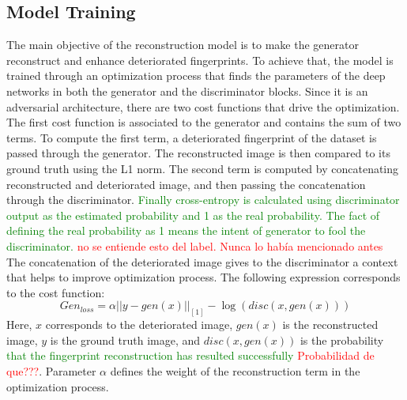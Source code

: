 \documentclass[a4paper,fleqn]{cas-dc}
\begin{document}
\subsection{Model Training}
\label{sec:MT}
The main objective of the reconstruction model is to make the generator reconstruct and enhance deteriorated fingerprints. To achieve that, the model is trained through an optimization process that finds the parameters of the deep networks in both the generator and the discriminator blocks. Since it is an adversarial architecture, there are two cost functions that drive the optimization. The first cost function is associated to the generator and contains the sum of two terms. To compute the first term, a deteriorated fingerprint of the dataset is passed through the generator. The reconstructed image is then compared to its ground truth using the L1 norm. The second term is computed by concatenating reconstructed and deteriorated image, and then passing the concatenation through the discriminator. \textcolor{green}{Finally cross-entropy is calculated using discriminator output as the estimated probability and 1 as the real probability. The fact of defining the real probability as 1 means the intent of generator to fool the discriminator.} \textcolor{red}{no se entiende esto del label. Nunca lo había mencionado antes} The concatenation of the deteriorated image gives to the discriminator a context that helps to improve optimization process. The following expression corresponds to the cost function:
\begin{equation}
    Gen_{loss} = \alpha||y-gen(x)||_{[1]} - \log(disc(x,gen(x)))
\end{equation}
Here, $x$ corresponds to the deteriorated image, $gen(x)$ is the reconstructed image, $y$ is the ground truth image, and $disc(x,gen(x))$ is the probability \textcolor{green}{that the fingerprint reconstruction has resulted successfully} \textcolor{red}{Probabilidad de que???}. Parameter $\alpha$ defines the weight of the reconstruction term in the optimization process.
\end{document}
